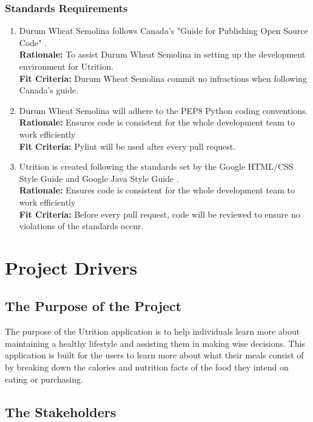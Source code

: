 \documentclass[12pt]{article}
\begin{document}
\subsubsection{Standards Requirements}
\begin{enumerate}[start=2,label={LR\arabic*.}]
	\item Durum Wheat Semolina follows Canada's "Guide for Publishing Open Source 
	Code" \citep{CanadianCode}.\\
	\textbf{Rationale:} To assist Durum Wheat Semolina in setting up the development environment for Utrition.\\
	\textbf{Fit Criteria:} Durum Wheat Semolina commit no infractions when following Canada’s guide.
	\item Durum Wheat Semolina will adhere to the PEP8 Python coding conventions.\\
	\textbf{Rationale:} Ensures code is consistent for the whole development team to work efficiently \\
	\textbf{Fit Criteria:} Pylint will be used after every pull request.
	\item Utrition is created following the standards set by the Google HTML/CSS Style Guide \citep{HTMLCSSStyle} and Google Java Style Guide \citep{JavaStyle}. \\
	\textbf{Rationale:} Ensures code is consistent for the whole development team to work efficiently \\
	\textbf{Fit Criteria:} Before every pull request, code will be reviewed to ensure no violations of the standards occur.
\end{enumerate}

\section{Project Drivers }

\subsection{The Purpose of the Project}

The purpose of the Utrition application is to help individuals learn more about maintaining a healthy lifestyle and assisting them in making wise decisions. This application is built for the users to learn more about what their meals consist of by breaking down the calories and nutrition facts of the food they intend on eating or purchasing.  

\subsection{The Stakeholders }
 
\end{document}
